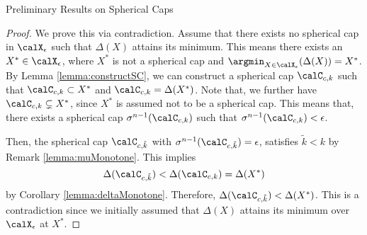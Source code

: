 \begin{section}{Preliminary Results on Spherical Caps}
\begin{proof}
We prove this via contradiction. Assume that there exists no spherical cap in $\calX_{\epsilon}$ such that $\Delta(X)$ attains its minimum. This means there exists an $X^* \in \calX_{\epsilon}$, where $X^*$ is not a spherical cap and $\argmin_{X \in \calX_{\epsilon}}(\Delta(X))=X^*$. By Lemma \ref{lemma:constructSC}, we can construct a spherical cap $\calC_{c,k}$ such that $\calC_{c,k} \subset X^*$ and $\calC_{c,k} = \Delta(X^*)$. Note that, we further have $\calC_{c,k} \subsetneq X^*$, since $X^*$ is assumed not to be a spherical cap. This means that, there exists a spherical cap $\sigma^{n-1}(\calC_{c,k})$ such that $\sigma^{n-1}(\calC_{c,k}) < \epsilon$. 

Then, the spherical cap $\calC_{c, \tilde{k}}$ with $\sigma^{n-1}(\calC_{c, \tilde{k}}) = \epsilon$, satisfies $\tilde{k} < k$ by Remark \ref{lemma:muMonotone}. This implies $$\Delta(\calC_{c, \tilde{k}}) < \Delta(\calC_{c, k}) = \Delta(X^*)$$ by Corollary \ref{lemma:deltaMonotone}. Therefore, $\Delta(\calC_{c, \tilde{k}}) < \Delta(X^*)$. This is a contradiction since we initially assumed that $\Delta(X)$ attains its minimum over $\calX_{\epsilon}$ at $X^*$.
\end{proof}
\end{section}

